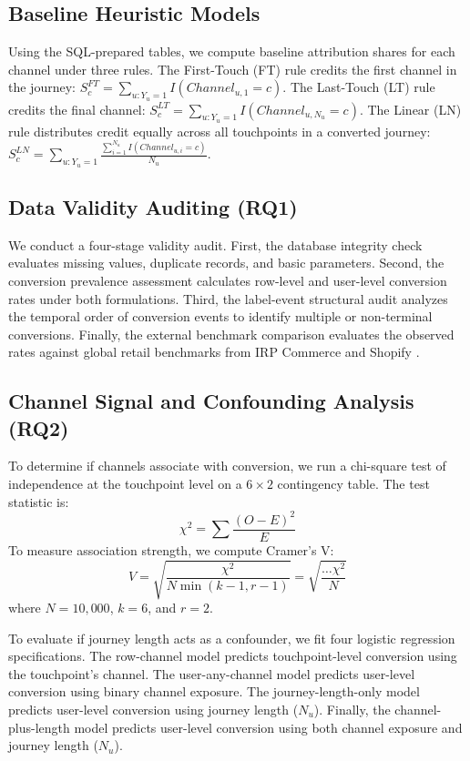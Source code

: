 \documentclass[pdflatex,sn-basic,Numbered]{sn-jnl}
\begin{document}
\subsection{Baseline Heuristic Models}

Using the SQL-prepared tables, we compute baseline attribution shares for each channel under three rules. The First-Touch (FT) rule credits the first channel in the journey: $S^{FT}_c = \sum_{u: Y_u=1} I(Channel_{u,1} = c)$. The Last-Touch (LT) rule credits the final channel: $S^{LT}_c = \sum_{u: Y_u=1} I(Channel_{u,N_u} = c)$. The Linear (LN) rule distributes credit equally across all touchpoints in a converted journey: $S^{LN}_c = \sum_{u: Y_u=1} \frac{\sum_{i=1}^{N_u} I(Channel_{u,i} = c)}{N_u}$.

\subsection{Data Validity Auditing (RQ1)}

We conduct a four-stage validity audit. First, the database integrity check evaluates missing values, duplicate records, and basic parameters. Second, the conversion prevalence assessment calculates row-level and user-level conversion rates under both formulations. Third, the label-event structural audit analyzes the temporal order of conversion events to identify multiple or non-terminal conversions. Finally, the external benchmark comparison evaluates the observed rates against global retail benchmarks from IRP Commerce \cite{irpcommerce2026} and Shopify \cite{shopify2026conversion}.

\subsection{Channel Signal and Confounding Analysis (RQ2)}

To determine if channels associate with conversion, we run a chi-square test of independence at the touchpoint level on a $6 \times 2$ contingency table. The test statistic is:
\noalign{\vskip3pt}
\begin{equation}
\chi^2 = \sum \frac{(O - E)^2}{E}
\end{equation}
To measure association strength, we compute Cramer's V:
\begin{equation}
V = \sqrt{\frac{\chi^2}{N \min(k-1, r-1)}} = \sqrt{\frac{\dots \chi^2}{N}}
\end{equation}
where $N = 10,000$, $k=6$, and $r=2$.

To evaluate if journey length acts as a confounder, we fit four logistic regression specifications. The row-channel model predicts touchpoint-level conversion using the touchpoint's channel. The user-any-channel model predicts user-level conversion using binary channel exposure. The journey-length-only model predicts user-level conversion using journey length ($N_u$). Finally, the channel-plus-length model predicts user-level conversion using both channel exposure and journey length ($N_u$).
\end{document}
